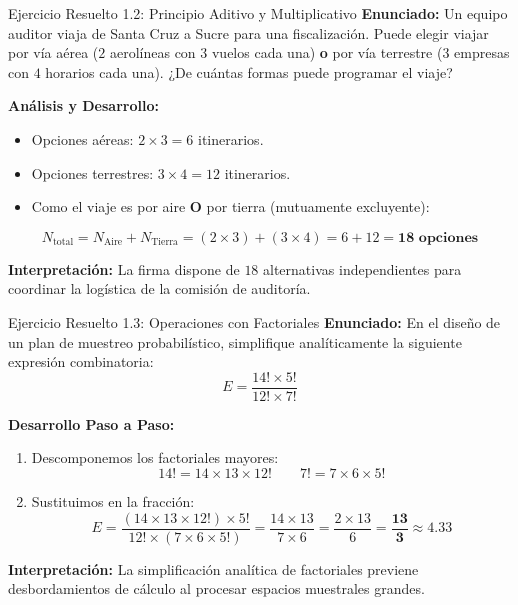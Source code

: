 \documentclass[10pt]{beamer}
\begin{document}
\begin{frame}{Ejercicio Resuelto 1.2: Principio Aditivo y Multiplicativo}
  \textbf{Enunciado:} Un equipo auditor viaja de Santa Cruz a Sucre para una fiscalización. Puede elegir viajar por vía aérea ($2$ aerolíneas con $3$ vuelos cada una) \textbf{o} por vía terrestre ($3$ empresas con $4$ horarios cada una). ¿De cuántas formas puede programar el viaje?

  \vspace{0.15cm}
  \textbf{Análisis y Desarrollo:}
  \begin{itemize}
    \item Opciones aéreas: $2 \times 3 = 6$ itinerarios.
    \item Opciones terrestres: $3 \times 4 = 12$ itinerarios.
    \item Como el viaje es por aire \textbf{O} por tierra (mutuamente excluyente):
  \end{itemize}

  $$N_{\text{total}} = N_{\text{Aire}} + N_{\text{Tierra}} = (2 \times 3) + (3 \times 4) = 6 + 12 = \mathbf{18 \text{ opciones}}$$

  \textbf{Interpretación:} La firma dispone de $18$ alternativas independientes para coordinar la logística de la comisión de auditoría.
\end{frame}

\begin{frame}{Ejercicio Resuelto 1.3: Operaciones con Factoriales}
  \textbf{Enunciado:} En el diseño de un plan de muestreo probabilístico, simplifique analíticamente la siguiente expresión combinatoria:
  $$E = \frac{14! \times 5!}{12! \times 7!}$$

  \vspace{0.1cm}
  \textbf{Desarrollo Paso a Paso:}
  \begin{enumerate}
    \item Descomponemos los factoriales mayores:
    $$14! = 14 \times 13 \times 12! \qquad 7! = 7 \times 6 \times 5!$$
    \item Sustituimos en la fracción:
    $$E = \frac{(14 \times 13 \times 12!) \times 5!}{12! \times (7 \times 6 \times 5!)} = \frac{14 \times 13}{7 \times 6} = \frac{2 \times 13}{6} = \mathbf{\frac{13}{3} \approx 4.33}$$
  \end{enumerate}

  \textbf{Interpretación:} La simplificación analítica de factoriales previene desbordamientos de cálculo al procesar espacios muestrales grandes.
\end{frame}
\end{document}
